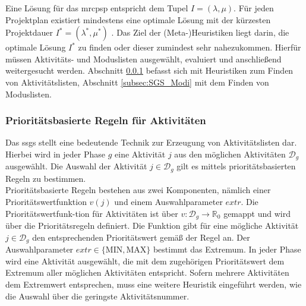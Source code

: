 Eine Lösung für das \ac{mrcpsp} entspricht dem Tupel $I = (\lambda, \mu)$. Für jeden Projektplan existiert mindestens eine optimale Lösung mit der kürzesten Projektdauer $I^* = (\lambda^*, \mu^*)$ \cite[vgl.][S. 4]{kolisch_heuristic_1998}. Das Ziel der (Meta-)Heuristiken liegt darin, die optimale Lösung $I^*$ zu finden oder dieser zumindest sehr nahezukommen. Hierfür müssen Aktivitäts- und Moduslisten ausgewählt, evaluiert und anschließend weitergesucht werden. Abschnitt \ref{subsec:SGS_Aktivitaeten} befasst sich mit Heuristiken zum Finden von Aktivitätslisten, Abschnitt \ref{subsec:SGS_Modi} mit dem Finden von Moduslisten. 

\subsubsection{Prioritätsbasierte Regeln für Aktivitäten} \label{subsec:SGS_Aktivitaeten}

Das \acl{ssgs} stellt eine bedeutende Technik zur Erzeugung von Aktivitätslisten dar. Hierbei wird in jeder Phase $g$ eine Aktivität $j$ aus den möglichen Aktivitäten $\mathcal{D}_g$ ausgewählt. Die Auswahl der Aktivität $j \in \mathcal{D}_g$ gilt es mittels prioritätsbasierten Regeln zu bestimmen. \cite[vgl.][S. 5]{kolisch_heuristic_1998}\\

Prioritätsbasierte Regeln bestehen aus zwei Komponenten, nämlich einer Prioritätswertfunktion $v(j)$ und einem Auswahlparameter $extr$. Die Prioritätswertfunk-tion für Aktivitäten ist über $v: \mathcal{D}_g \rightarrow \mathbb{R}_0$ gemappt und wird über die Prioritätsregeln definiert. Die Funktion gibt für eine mögliche Aktivität $j \in \mathcal{D}_g$ den entsprechenden Prioritätswert gemäß der Regel an. Der Auswahlparameter $extr \in \{ \text{MIN}, \text{MAX} \}$ bestimmt das Extremum. In jeder Phase wird eine Aktivität ausgewählt, die mit dem zugehörigen Prioritätswert dem Extremum aller möglichen Aktivitäten entspricht. Sofern mehrere Aktivitäten dem Extremwert entsprechen, muss eine weitere Heuristik eingeführt werden, wie die Auswahl über die geringste Aktivitätsnummer. \cite[vgl.][S. 6 f.]{schirmer_parameterized_1997}


